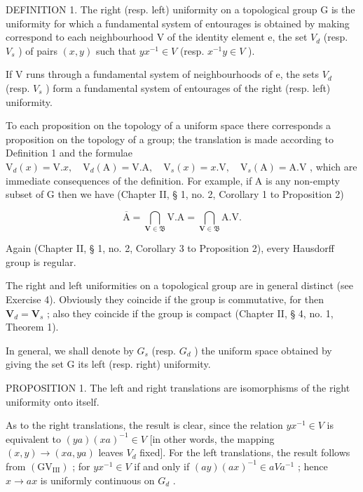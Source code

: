 DEFINITION 1. The right (resp. left) uniformity on a topological group G is the uniformity for which a fundamental system of entourages is obtained by making correspond to each neighbourhood V of the identity element e, the set \(V_{d}\) (resp. \(V_{s}\) ) of pairs \((x, y)\) such that \(y x^{-1} \in V\) (resp. \(x^{-1} y \in V\) ).

If V runs through a fundamental system of neighbourhoods of e, the sets \(V_{d}\) (resp. \(V_{s}\) ) form a fundamental system of entourages of the right (resp. left) uniformity.

To each proposition on the topology of a uniform space there corresponds a proposition on the topology of a group; the translation is made according to Definition 1 and the formulae \(\mathrm{V}_{d}(x)=\mathrm{V}.x,\quad\mathrm{V}_{d}(\mathrm{A})=\mathrm{V}.\mathrm{A},\quad\mathrm{V}_{s}(x)=x.\mathrm{V},\quad\mathrm{V}_{s}(\mathrm{A})=\mathrm{A}.\mathrm{V}\) , which are immediate consequences of the definition. For example, if A is any non-empty subset of G then we have (Chapter II, § 1, no. 2, Corollary 1 to Proposition 2)

\[
\overline {{{\mathrm{A}}}} = \bigcap_ {\mathbf {V} \in \mathfrak {B}} \mathrm{V}. \mathrm{A} = \bigcap_ {\mathbf {V} \in \mathfrak {B}} \mathrm{A}. \mathrm{V}.\tag{1}
\]

Again (Chapter II, § 1, no. 2, Corollary 3 to Proposition 2), every Hausdorff group is regular.

The right and left uniformities on a topological group are in general distinct (see Exercise 4). Obviously they coincide if the group is commutative, for then \(\mathbf{V}_d = \mathbf{V}_s\) ; also they coincide if the group is compact (Chapter II, § 4, no. 1, Theorem 1).

In general, we shall denote by \(G_{s}\) (resp. \(G_{d}\) ) the uniform space obtained by giving the set G its left (resp. right) uniformity.

PROPOSITION 1. The left and right translations are isomorphisms of the right uniformity onto itself.

As to the right translations, the result is clear, since the relation \(yx^{-1} \in V\) is equivalent to \((ya)(xa)^{-1} \in V\) {[}in other words, the mapping \((x, y) \to (xa, ya)\) leaves \(V_d\) fixed{]}. For the left translations, the result follows from \((\mathrm{GV}_{\mathrm{III}})\) ; for \(yx^{-1} \in V\) if and only if \((ay)(ax)^{-1} \in aVa^{-1}\) ; hence \(x \to ax\) is uniformly continuous on \(G_{d}\) .

